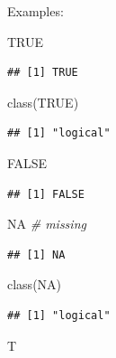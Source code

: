 \documentclass[
]{book}
\newenvironment{Shaded}{\begin{snugshade}}{\end{snugshade}}
\newcommand{\CommentTok}[1]{\textcolor[rgb]{0.56,0.35,0.01}{\textit{#1}}}
\newcommand{\ConstantTok}[1]{\textcolor[rgb]{0.00,0.00,0.00}{#1}}
\newcommand{\FunctionTok}[1]{\textcolor[rgb]{0.00,0.00,0.00}{#1}}
\newcommand{\NormalTok}[1]{#1}
\begin{document}
Examples:

\begin{Shaded}
\begin{Highlighting}[]
\ConstantTok{TRUE}
\end{Highlighting}
\end{Shaded}

\begin{verbatim}
## [1] TRUE
\end{verbatim}

\begin{Shaded}
\begin{Highlighting}[]
\FunctionTok{class}\NormalTok{(}\ConstantTok{TRUE}\NormalTok{)}
\end{Highlighting}
\end{Shaded}

\begin{verbatim}
## [1] "logical"
\end{verbatim}

\begin{Shaded}
\begin{Highlighting}[]
\ConstantTok{FALSE}
\end{Highlighting}
\end{Shaded}

\begin{verbatim}
## [1] FALSE
\end{verbatim}

\begin{Shaded}
\begin{Highlighting}[]
\ConstantTok{NA}  \CommentTok{\# missing}
\end{Highlighting}
\end{Shaded}

\begin{verbatim}
## [1] NA
\end{verbatim}

\begin{Shaded}
\begin{Highlighting}[]
\FunctionTok{class}\NormalTok{(}\ConstantTok{NA}\NormalTok{)}
\end{Highlighting}
\end{Shaded}

\begin{verbatim}
## [1] "logical"
\end{verbatim}

\begin{Shaded}
\begin{Highlighting}[]
\NormalTok{T}
\end{Highlighting}
\end{Shaded}
\end{document}
